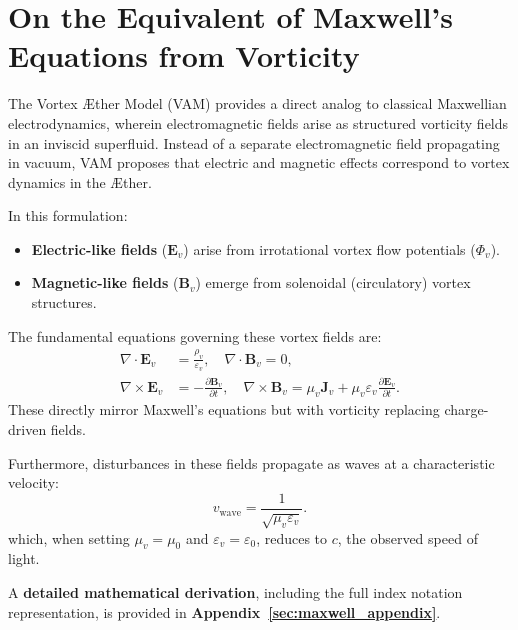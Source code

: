 \section{On the Equivalent of Maxwell’s Equations from Vorticity}

The Vortex Æther Model (VAM) provides a direct analog to classical Maxwellian electrodynamics, wherein electromagnetic fields arise as structured vorticity fields in an inviscid superfluid. Instead of a separate electromagnetic field propagating in vacuum, VAM proposes that electric and magnetic effects correspond to vortex dynamics in the Æther.

In this formulation:
\begin{itemize}
    \item \textbf{Electric-like fields} (\(\mathbf{E}_v\)) arise from irrotational vortex flow potentials (\(\Phi_v\)).
    \item \textbf{Magnetic-like fields} (\(\mathbf{B}_v\)) emerge from solenoidal (circulatory) vortex structures.
\end{itemize}

The fundamental equations governing these vortex fields are:
\begin{align}
    \nabla \cdot \mathbf{E}_v &= \frac{\rho_v}{\varepsilon_v}, \quad \nabla \cdot \mathbf{B}_v = 0, \label{eq:gauss_vam} \\
    \nabla \times \mathbf{E}_v &= -\frac{\partial \mathbf{B}_v}{\partial t}, \quad \nabla \times \mathbf{B}_v = \mu_v \mathbf{J}_v + \mu_v \varepsilon_v \frac{\partial \mathbf{E}_v}{\partial t}. \label{eq:maxwell_vam}
\end{align}
These directly mirror Maxwell’s equations but with vorticity replacing charge-driven fields.

Furthermore, disturbances in these fields propagate as waves at a characteristic velocity:
\begin{equation}
    v_{\text{wave}} = \frac{1}{\sqrt{\mu_v \varepsilon_v}}.
\end{equation}
which, when setting \(\mu_v = \mu_0\) and \(\varepsilon_v = \varepsilon_0\), reduces to \( c \), the observed speed of light.

A \textbf{detailed mathematical derivation}, including the full index notation representation, is provided in \textbf{Appendix~\ref{sec:maxwell_appendix}}.

